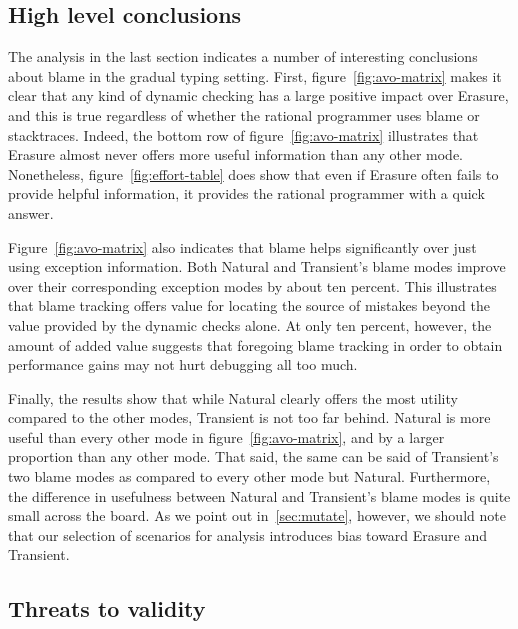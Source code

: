 \subsection{High level conclusions}

The analysis in the last section indicates a number of interesting conclusions about blame in the gradual typing setting.
First, figure~\ref{fig:avo-matrix} makes it clear that any kind of dynamic checking has a large positive impact over Erasure, and this is true regardless of whether the rational programmer uses blame or stacktraces.
Indeed, the bottom row of figure~\ref{fig:avo-matrix} illustrates that Erasure almost never offers more useful information than any other mode.
Nonetheless, figure~\ref{fig:effort-table} does show that even if Erasure often fails to provide helpful information, it provides the rational programmer with a quick answer.

Figure~\ref{fig:avo-matrix} also indicates that blame helps significantly over just using exception information.
Both Natural and Transient's blame modes improve over their corresponding exception modes by about ten percent.
This illustrates that blame tracking offers value for locating the source of mistakes beyond the value provided by the dynamic checks alone.
At only ten percent, however, the amount of added value suggests that foregoing blame tracking in order to obtain performance gains may not hurt debugging all too much.

Finally, the results show that while Natural clearly offers the most utility compared to the other modes, Transient is not too far behind.
Natural is more useful than every other mode in figure~\ref{fig:avo-matrix}, and by a larger proportion than any other mode.
That said, the same can be said of Transient's two blame modes as compared to every other mode but Natural.
Furthermore, the difference in usefulness between Natural and Transient's blame modes is quite small across the board.
As we point out in~\ref{sec:mutate}, however, we should note that our selection of scenarios for analysis introduces bias toward Erasure and Transient.


\subsection{Threats to validity}

